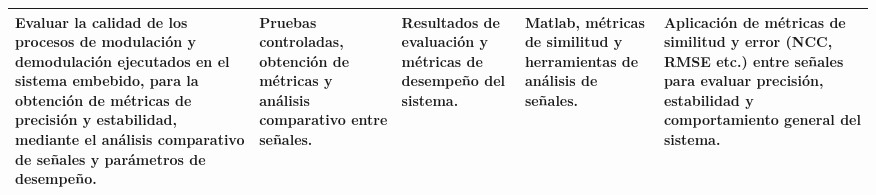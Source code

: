 \begin{table}[H]
{\begin{tabular}{|p{4cm}|p{2.7cm}|p{2.7cm}|p{2.7cm}|p{3.2cm}|}
Evaluar la calidad de los procesos de modulación y demodulación ejecutados en el sistema embebido, para la obtención de métricas de precisión y estabilidad, mediante el análisis comparativo de señales y parámetros de desempeño.
&
Pruebas controladas, obtención de métricas y análisis comparativo entre señales.
&
Resultados de evaluación y métricas de desempeño del sistema.
&
Matlab, métricas de similitud y herramientas de análisis de señales.
&
Aplicación de métricas de similitud y error (NCC, RMSE etc.) entre señales para evaluar precisión, estabilidad y comportamiento general del sistema.
\\ \hline

\end{tabular}
\label{tab:objetivos}
}
\end{table}
